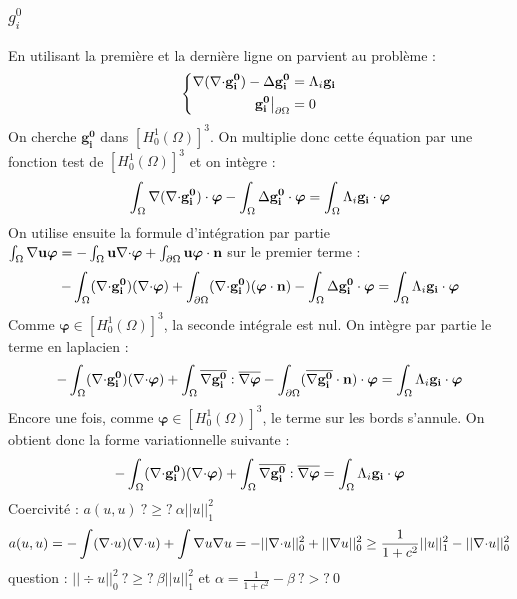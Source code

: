 \subsubsection{$g_i^0$}
En utilisant la première et la dernière ligne on parvient au problème :
\begin{equation}
\label{gi0}
\left\{
\begin{aligned}
{\nabla}({\nabla\cdot} \mathbf{g_i^0})-{\Delta} \mathbf{g_i^0} &= \Lambda_i\mathbf{g_i}\\
\mathbf{g_i^0}{\big\rvert_{\partial\Omega}} &= 0
\end{aligned}
\right.
\end{equation}
On cherche $\mathbf{g_i^0}$ dans $[H^1_0(\Omega)]^3$. On multiplie donc cette équation par une fonction test de $[H^1_0(\Omega)]^3$ et on intègre :
\[
\int_\Omega {\nabla}({\nabla\cdot} \mathbf{g_i^0})\cdot\bm{\varphi} - \int_\Omega {\Delta} \mathbf{g_i^0}\cdot\bm{\varphi} = \int_\Omega \Lambda_i\mathbf{g_i}\cdot\bm{\varphi}
\]
On utilise ensuite la formule d'intégration par partie $\int_\Omega {\nabla}{\mathbf{u}}\bm{\varphi} = -\int_\Omega \mathbf{u}{\nabla\cdot}\bm{\varphi} + \int_{\partial\Omega} \mathbf{u}\bm{\varphi}\cdot \mathbf{n}$ sur le premier terme :
\[
-\int_\Omega ({\nabla\cdot} \mathbf{g_i^0})({\nabla\cdot}\bm{\varphi}) + \int_{\partial\Omega} ({\nabla\cdot} \mathbf{g_i^0})(\bm{\varphi}\cdot \mathbf{n}) - \int_\Omega {\Delta} \mathbf{g_i^0}\cdot\bm{\varphi} = \int_\Omega \Lambda_i\mathbf{g_i}\cdot\bm{\varphi}
\]
Comme $\bm{\varphi}\in [H^1_0(\Omega)]^3$, la seconde intégrale est nul. On intègre par partie le terme en laplacien :
\[
-\int_\Omega ({\nabla\cdot} \mathbf{g_i^0})({\nabla\cdot}\bm{\varphi}) + \int_\Omega \overline{{\nabla} \mathbf{g_i^0}}:\overline{{\nabla}\bm{\varphi}} - \int_{\partial\Omega} (\overline{{\nabla} \mathbf{g_i^0}}\cdot \mathbf{n})\cdot\bm{\varphi} = \int_\Omega \Lambda_i\mathbf{g_i}\cdot\bm{\varphi}
\]
Encore une fois, comme $\bm{\varphi}\in [H^1_0(\Omega)]^3$, le terme sur les bords s'annule. On obtient donc la forme variationnelle suivante :
\begin{equation}
\label{fvgi0}
-\int_\Omega ({\nabla\cdot} \mathbf{g_i^0})({\nabla\cdot}\bm{\varphi}) + \int_\Omega \overline{{\nabla} \mathbf{g_i^0}}:\overline{{\nabla}\bm{\varphi}} = \int_\Omega \Lambda_i\mathbf{g_i}\cdot\bm{\varphi}
\end{equation}
Coercivité : $a(u,u)\ ?\geq?\ \alpha||u||^2_1$\\
\[a(u,u)=-\int({\nabla\cdot} u)({\nabla\cdot} u) + \int {\nabla} u{\nabla} u = -||{\nabla\cdot} u||_0^2 + ||{\nabla} u||^2_0 \geq \frac{1}{1+c^2}||u||^2_1 - ||{\nabla\cdot} u||^2_0\]
question : $||\div u||^2_0\ ?\geq?\ \beta ||u||^2_1$ et $\alpha=\frac{1}{1+c^2}-\beta\ ?>?\ 0$\\


